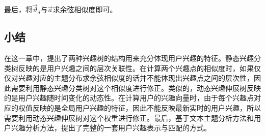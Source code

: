 最后，将$\vec{\vartheta}_d$与$\vec{a}$求余弦相似度即可。

\subsection{小结}
在这一章中，提出了两种兴趣树的结构用来充分体现用户兴趣的特征。静态兴趣分类树反映的是用户兴趣之间的层次关联性。在计算两个兴趣点的相似度时，如果仅仅对兴趣对应的主题分布求余弦相似度的话并不能体现出兴趣点之间的层次性，因此需要利用静态兴趣分类树对这个相似度进行修正。类似的，动态兴趣伸展树反映的是用户兴趣随时间变化的动态性。在计算用户的兴趣向量时，由于每个兴趣点对应的权值反映的是全局用户兴趣的特征，因此不能反映最新实时的用户兴趣，所以需要利用动态兴趣伸展树对这个权重进行修正。最后，基于文本主题分析方法和用户兴趣分析方法，提出了完整的一套用户兴趣表示与匹配的方式。
